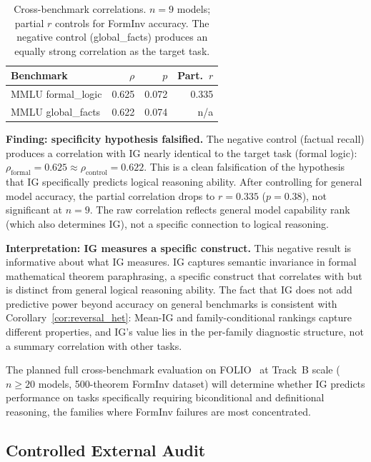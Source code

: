 \documentclass{article}
\begin{document}
\begin{table}[h]
\centering\small
\caption{Cross-benchmark correlations. $n=9$ models; partial $r$ controls for FormInv accuracy.
The negative control (global\_facts) produces an equally strong correlation as the target task.}
\begin{tabular}{p{3.2cm}rrr}
\toprule
Benchmark & $\rho$ & $p$ & Part.\ $r$ \\
\midrule
MMLU formal\_logic & 0.625 & 0.072 & 0.335 \\
MMLU global\_facts & 0.622 & 0.074 & n/a \\
\bottomrule
\end{tabular}
\end{table}

\textbf{Finding: specificity hypothesis falsified.}
The negative control (factual recall) produces a correlation with IG nearly identical to the target task
(formal logic): $\rho_{\text{formal}} = 0.625 \approx \rho_{\text{control}} = 0.622$.
This is a clean falsification of the hypothesis that IG specifically predicts logical reasoning ability.
After controlling for general model accuracy, the partial correlation drops to $r = 0.335$ ($p = 0.38$),
not significant at $n=9$.
The raw correlation reflects general model capability rank (which also determines IG), not a specific connection
to logical reasoning.

\textbf{Interpretation: IG measures a specific construct.}
This negative result is informative about what IG measures.
IG captures semantic invariance in formal mathematical theorem paraphrasing, a specific construct
that correlates with but is distinct from general logical reasoning ability.
The fact that IG does not add predictive power beyond accuracy on general benchmarks is consistent
with Corollary~\ref{cor:reversal_het}: Mean-IG and family-conditional rankings capture different properties,
and IG's value lies in the per-family diagnostic structure, not a summary correlation with other tasks.

The planned full cross-benchmark evaluation on FOLIO~\citep{han2022folio} at Track~B scale
($n \geq 20$ models, 500-theorem FormInv dataset) will determine whether IG predicts performance
on tasks specifically requiring biconditional and definitional reasoning, the families where
FormInv failures are most concentrated.

\subsection{Controlled External Audit}
\label{app:external}
\end{document}
